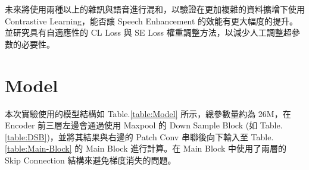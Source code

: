 \documentclass[10pt,twocolumn,letterpaper]{article}
\begin{document}
\begin{CJK}{UTF8}{bkai}
   未來將使用兩種以上的雜訊與語音進行混和，以驗證在更加複雜的資料擴增下使用 Contrastive
   Learning，能否讓 Speech Enhancement 的效能有更大幅度的提升。並研究具有自適應性的
   CL Loss 與 SE Loss 權重調整方法，以減少人工調整超參數的必要性。

   {\small
   
   
   }
   \newpage

   \appendix
   \section{Model} \label{Model}
   本次實驗使用的模型結構如 Table.\ref{table:Model} 所示，總參數量約為 26M，在 Encoder 前三層左邊會通過使用 Maxpool 的
   Down Sample Block (如 Table.\ref{table:DSB})，並將其結果與右邊的 Patch Conv 串聯後向下輸入至 Table.\ref{table:Main-Block} 的 Main Block
   進行計算。在 Main Block 中使用了兩層的 Skip Connection 結構來避免梯度消失的問題。


\end{CJK}
\end{document}
